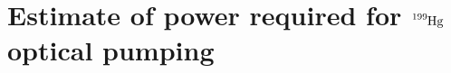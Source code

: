
\chapter{
    \texorpdfstring{Estimate of power required for $\ce{^{199}Hg}$ optical pumping}
    {Estimate of power required for 199Hg optical pumping}\label{appx:199hg_pumping}
}


\cite{Hilborn1982}